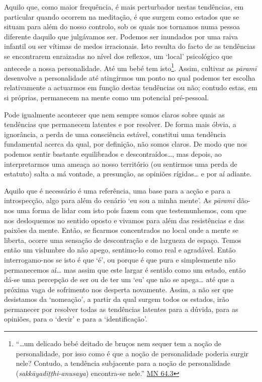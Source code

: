 Aquilo que, como maior frequência, é mais perturbador nestas tendências, em particular quando ocorrem na meditação, é que surgem como estados que se situam para além do nosso controlo, sob os quais nos tornamos numa pessoa diferente daquilo que julgávamos ser. Podemos ser inundados por uma raiva infantil ou ser vítimas de medos irracionais. Isto resulta do facto de as tendências se encontrarem enraizadas no nível dos reflexos, um `local' psicológico que antecede a nossa personalidade. Até um bebé tem isto\footnote{``\ldots um delicado bebé deitado de bruços nem sequer tem a noção de \textquotesingle personalidade\textquotesingle, por isso como é que a noção de personalidade poderia surgir nele? Contudo, a tendência subjacente para a noção de personalidade (\emph{sakkāyadiṭṭhi-anusaya}) encontra-se nele.'' \href{https://suttacentral.net/mn64/en/bodhi}{MN 64.3}}. Assim, cultivar as \emph{pāramī} desenvolve a personalidade até atingirmos um ponto no qual podemos ter escolha relativamente a actuarmos em função destas tendências ou não; contudo estas, em si próprias, permanecem na mente como um potencial pré-pessoal.

Pode igualmente acontecer que nem sempre somos claros sobre quais as tendências que permanecem latentes e por resolver. De forma mais óbvia, a ignorância, a perda de uma consciência estável, constitui uma tendência fundamental acerca da qual, por definição, não somos claros. De modo que nos podemos sentir bastante equilibrados e descontraídos\ldots{}, mas depois, ao interpretarmos uma ameaça ao nosso território (ou sentirmos uma perda de estatuto) salta a má vontade, a presunção, as opiniões rígidas\ldots{} e por aí adiante.

Aquilo que é necessário é uma referência, uma base para a acção e para a introspecção, algo para além do cenário `eu sou a minha mente'. As \emph{pāramī} dão-nos uma forma de lidar com isto pois fazem com que testemunhemos, com que nos desloquemos no sentido oposto e vivamos para além das resistências e das paixões da mente. Então, se ficarmos concentrados no local onde a mente se liberta, ocorre uma sensação de descontração e de largueza de espaço. Temos então um vislumbre do não apego, sentimo-lo como real e agradável. Então interrogamo-nos se isto é que `é', ou porque é que pura e simplesmente não permanecemos aí\ldots{} mas assim que este largar é sentido como um estado, então dá-se uma percepção de ser ou de ter um `eu' que não se apega\ldots{} até que a próxima vaga de sofrimento nos desperta novamente. Assim, a não ser que desistamos da `nomeação', a partir da qual surgem todos os estados, irão permanecer por resolver todas as tendências latentes para a dúvida, para as opiniões, para o `devir' e para a `identificação'.

